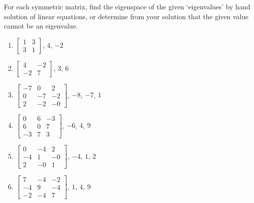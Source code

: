 \begin{exercise} \label{eg:}
For each symmetric matrix, find the eigenspace of the given `eigenvalues' by hand solution of linear equations, or determine from your solution that the given value cannot be an eigenvalue.
\begin{enumerate}
\item \(\begin{bmatrix} 1&3\\3&1 \end{bmatrix}\), \(4\), \(-2\)
\item \(\begin{bmatrix} 4&-2\\-2&7 \end{bmatrix}\), \(3\), \(6\)
\item \(\begin{bmatrix} -7 & 0 & 2
\\ 0 & -7 & -2
\\ 2 & -2 & -0 \end{bmatrix}\), \(-8\), \(-7\), \(1\)
\item \(\begin{bmatrix} 0 & 6 & -3
\\ 6 & 0 & 7
\\ -3 & 7 & 3 \end{bmatrix}\), \(-6\), \(4\), \(9\)
\item \(\begin{bmatrix} 0 & -4 & 2
\\ -4 & 1 & -0
\\ 2 & -0 & 1 \end{bmatrix}\), \(-4\), \(1\), \(2\)

\item \(\begin{bmatrix} 7 & -4 & -2
\\ -4 & 9 & -4
\\ -2 & -4 & 7 \end{bmatrix}\), \(1\), \(4\), \(9\)
\end{enumerate}
\end{exercise}



